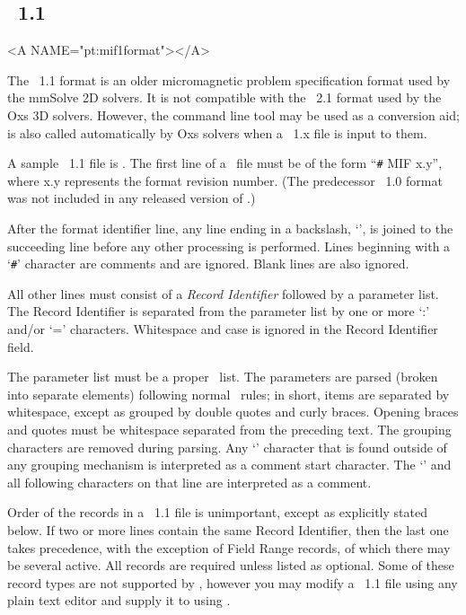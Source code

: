 
\subsection{\MIF\ 1.1}\label{sec:mif1format}
\begin{rawhtml}
<A NAME="pt:mif1format"></A>
\end{rawhtml}
The \MIF~1.1 format is an older micromagnetic problem specification
format used by the mmSolve 2D solvers.  It is not compatible with the
\MIF~2.1 format used by the Oxs 3D solvers.  However, the command line tool
 may be used as a conversion aid;
 is also called automatically by Oxs solvers when a
\MIF~1.x file is input to them.

A sample \MIF~1.1 file is .  The first line of a \MIF\ file must be of the
form ``\verb+#+ MIF x.y'', where x.y represents the format revision
number.  (The predecessor \MIF~1.0 format was not included in any
released version of \OOMMF.)  

After the format identifier line, any line ending in a backslash,
`\bs', is joined to the succeeding line before any other processing
is performed.  Lines beginning with a `\verb+#+' character are comments
and are ignored.  Blank lines are also ignored.

All other lines must consist of a {\em Record Identifier} followed by
a parameter list.  The Record Identifier is separated from the
parameter list by one or more `:' and/or `=' characters.  Whitespace
and case is ignored in the Record Identifier field.

The parameter list must be a proper \Tcl\ list.  The
parameters are parsed (broken into separate elements) following normal
\Tcl\ rules; in short, items are separated by whitespace, except as
grouped by double quotes and curly braces.  Opening braces and quotes
must be whitespace separated from the preceding text.  The grouping
characters are removed during parsing.  Any `\lb' character that is
found outside of any grouping mechanism is interpreted as a comment
start character.  The `\lb' and all following characters on that line
are interpreted as a comment.

Order of the records in a \MIF~1.1 file is unimportant, except as
explicitly stated below.  If two or more lines contain the same Record
Identifier, then the last one takes precedence,
with the exception of Field Range records, of which there may be several
active.  All records are required unless listed as optional.  Some of
these record types are not supported by , however you
may modify a \MIF~1.1 file using any plain text editor and supply it to
using 
.

